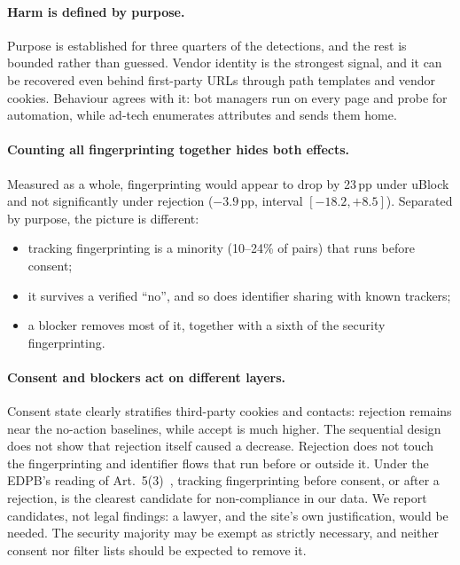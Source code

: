 \documentclass[sigconf,review,anonymous]{acmart}
\newcommand{\pp}{\,pp}
\begin{document}
\paragraph{Harm is defined by purpose.} Purpose is established for three quarters of the
detections, and the rest is bounded rather than guessed. Vendor identity is the strongest
signal, and it can be recovered even behind first-party URLs through path templates and vendor
cookies. Behaviour agrees with it: bot managers run on every page and probe for automation,
while ad-tech enumerates attributes and sends them home.

\paragraph{Counting all fingerprinting together hides both effects.} Measured as a whole,
fingerprinting would appear to drop by 23\pp{} under uBlock and not significantly under
rejection ($-3.9$\pp{}, interval $[-18.2, +8.5]$).
Separated by purpose, the picture is different:
\begin{itemize}
\item tracking fingerprinting is a minority (10--24\% of pairs) that runs before consent;
\item it survives a verified ``no'', and so does identifier sharing with known trackers;
\item a blocker removes most of it, together with a sixth of the security fingerprinting.
\end{itemize}

\paragraph{Consent and blockers act on different layers.} Consent state clearly stratifies
third-party cookies and contacts: rejection remains near the no-action baselines, while accept
is much higher. The sequential design does not show that rejection itself caused a decrease.
Rejection does not touch the
fingerprinting and identifier flows that run before or outside it. Under the EDPB's reading of
Art.~5(3)~\cite{edpb2023scope}, tracking fingerprinting before consent, or after a rejection, is
the clearest candidate for non-compliance in our data. We report candidates, not legal findings:
a lawyer, and the site's own justification, would be needed. The security majority may be
exempt as strictly necessary, and neither consent nor filter lists should be expected to remove
it.

\end{document}

